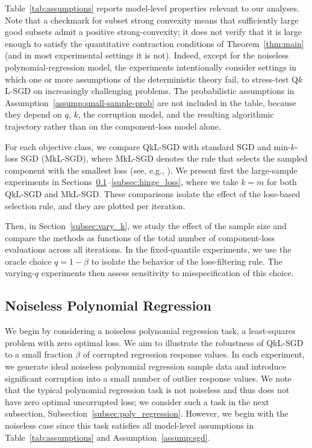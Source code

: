 \documentclass[11pt]{article}
\begin{document}
Table~\ref{tab:assumptions} reports model-level properties relevant to our
analyses. Note that a checkmark for subset strong convexity means that
sufficiently large good subsets admit a positive strong-convexity; it
does not verify that it is large enough to satisfy the quantitative
contraction conditions of Theorem~\ref{thm:main} (and in most experimental settings it is not). Indeed, except for the
noiseless polynomial-regression model, the experiments intentionally consider
settings in which one or more assumptions of the deterministic theory fail,
to stress-test Q\(k\)L-SGD on increasingly challenging
problems. The probabilistic assumptions in
Assumption~\ref{assump:small-sample-prob} are not included in the table,
because they depend on \(q\), \(k\), the corruption model, and the resulting
algorithmic trajectory rather than on the component-loss model alone.


For each objective class, we compare QkL-SGD with standard SGD and
min-$k$-loss SGD (MkL-SGD), where MkL-SGD denotes the rule that selects the
sampled component with the smallest loss (see, e.g., \cite{shah2020choosing}). We present first the {large-sample} experiments in Sections~\ref{subsec:noiseless_poly_regression}--\ref{subsec:hinge_loss}, where we
take $k=m$ for both QkL-SGD and MkL-SGD. These comparisons isolate the effect
of the loss-based selection rule, and they are plotted per iteration.


Then, in {Section~\ref{subsec:vary_k}}, we
study the effect of the sample size and compare the methods as
functions of the total number of component-loss evaluations {across all iterations}. {In the fixed-quantile experiments, we use the oracle choice \(q=1-\beta\)
to isolate the behavior of the loss-filtering rule. The varying-\(q\)
experiments then assess sensitivity to misspecification of this choice.}


\subsection{Noiseless Polynomial Regression}\label{subsec:noiseless_poly_regression}

We begin by considering a noiseless polynomial regression task, a least-squares problem with zero optimal loss.  We aim to illustrate the robustness of QkL-SGD to a small fraction $\beta$ of corrupted regression response values.  In each experiment, we generate ideal noiseless polynomial regression sample data and introduce significant corruption into a small number of outlier response values.  We note that the typical polynomial regression task is not noiseless and thus does not have zero optimal uncorrupted loss; we consider such a task in the next subsection, Subsection~\ref{subsec:poly_regression}.  However, we begin with the noiseless case since this task satisfies all {model-level} assumptions {in Table~\ref{tab:assumptions} and } Assumption~\ref{assump:sgd}.
\end{document}
